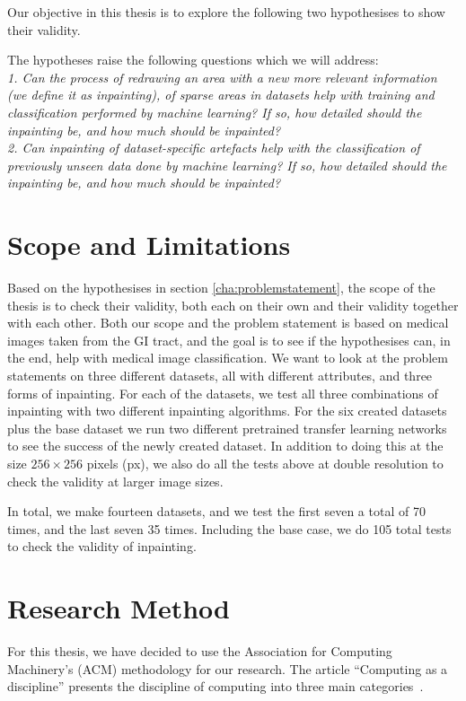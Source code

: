 Our objective in this thesis is to explore the following two hypothesises to show their validity.

The hypotheses raise the following questions which we will address:\\

\noindent \textit{1. Can the process of redrawing an area with a new more relevant information (we define it as inpainting), of sparse areas in datasets help with training and classification performed by machine learning? If so, how detailed should the inpainting be, and how much should be inpainted?}\\

\noindent \textit{2. Can inpainting of dataset-specific artefacts help with the classification of previously unseen data done by machine learning? If so, how detailed should the inpainting be, and how much should be inpainted?}

\section{Scope and Limitations}
Based on the hypothesises in section \ref{cha:problemstatement}, the scope of the thesis is to check their validity, both each on their own and their validity together with each other. 
Both our scope and the problem statement is based on medical images taken from the GI tract, and the goal is to see if the hypothesises can, in the end, help with medical image classification.
We want to look at the problem statements on three different datasets, all with different attributes, and three forms of inpainting.
For each of the datasets, we test all three combinations of inpainting with two different inpainting algorithms. 
For the six created datasets plus the base dataset we run two different pretrained transfer learning networks to see the success of the newly created dataset.
In addition to doing this at the size $256 \times 256$ pixels (px), we also do all the tests above at double resolution to check the validity at larger image sizes.

In total, we make fourteen datasets, and we test the first seven a total of 70 times, and the last seven 35 times. Including the base case, we do 105 total tests to check the validity of inpainting.


\section{Research Method}
For this thesis, we have decided to use the Association for Computing Machinery's (ACM) methodology for our research. The article ``Computing as a discipline'' presents the discipline of computing into three main categories~\cite{Denning:1989:CD:63238.63239}. 
